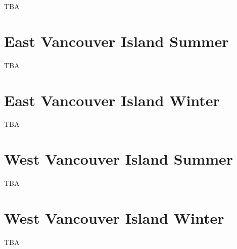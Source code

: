 \documentclass[
]{book}
\begin{document}
TBA

\hypertarget{east-vancouver-island-summer}{%
\section{East Vancouver Island Summer}\label{east-vancouver-island-summer}}

TBA

\hypertarget{east-vancouver-island-winter}{%
\section{East Vancouver Island Winter}\label{east-vancouver-island-winter}}

TBA

\hypertarget{west-vancouver-island-summer}{%
\section{West Vancouver Island Summer}\label{west-vancouver-island-summer}}

TBA

\hypertarget{west-vancouver-island-winter}{%
\section{West Vancouver Island Winter}\label{west-vancouver-island-winter}}

TBA

  
\end{document}
